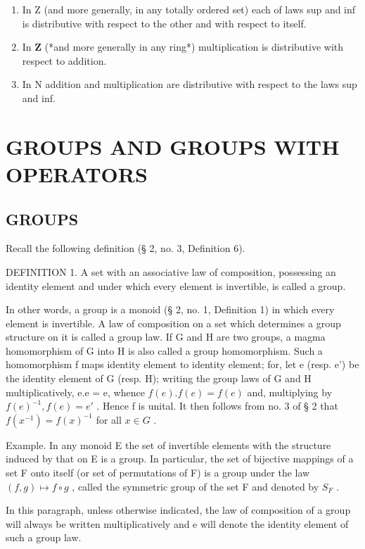 \begin{enumerate}
\def\labelenumi{(\arabic{enumi})}
\setcounter{enumi}{1}
\item
  In Z (and more generally, in any totally ordered set) each of laws sup and inf is distributive with respect to the other and with respect to itself.
\item
  In \(\mathbf{Z}\) (*and more generally in any ring*) multiplication is distributive with respect to addition.
\item
  In N addition and multiplication are distributive with respect to the laws sup and inf.
\end{enumerate}

\section{GROUPS AND GROUPS WITH OPERATORS}

\subsection{GROUPS}

Recall the following definition (§ 2, no. 3, Definition 6).

DEFINITION 1. A set with an associative law of composition, possessing an identity element and under which every element is invertible, is called a group.

In other words, a group is a monoid (§ 2, no. 1, Definition 1) in which every element is invertible. A law of composition on a set which determines a group structure on it is called a group law. If G and H are two groups, a magma homomorphism of G into H is also called a group homomorphism. Such a homomorphism f maps identity element to identity element; for, let e (resp. e') be the identity element of G (resp. H); writing the group laws of G and H multiplicatively, e.e = e, whence \(f(e).f(e) = f(e)\) and, multiplying by \(f(e)^{-1}, f(e) = e'\) . Hence f is unital. It then follows from no. 3 of § 2 that \(f(x^{-1}) = f(x)^{-1}\) for all \(x \in G\) .

Example. In any monoid E the set of invertible elements with the structure induced by that on E is a group. In particular, the set of bijective mappings of a set F onto itself (or set of permutations of F) is a group under the law \((f, g) \mapsto f \circ g\) , called the symmetric group of the set F and denoted by \(S_{F}\) .

In this paragraph, unless otherwise indicated, the law of composition of a group will always be written multiplicatively and e will denote the identity element of such a group law.

